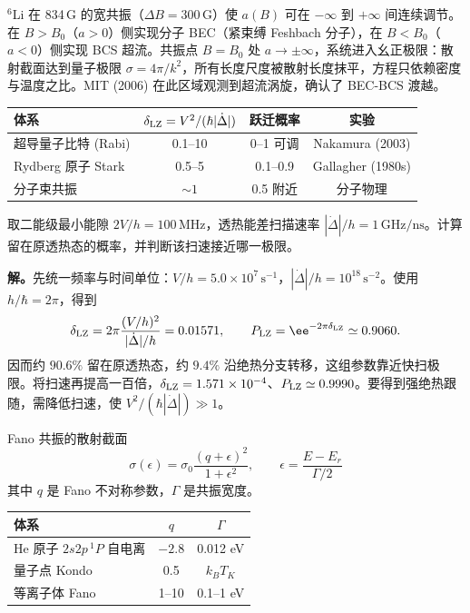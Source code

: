 \begin{exbox}
\(^6\)Li 在 834\,G 的宽共振（\(\Delta B=300\,\mathrm{G}\)）使 \(a(B)\) 可在 \(-\infty\) 到 \(+\infty\) 间连续调节。在 \(B>B_0\)（\(a>0\)）侧实现分子 BEC（紧束缚 Feshbach 分子），在 \(B<B_0\)（\(a<0\)）侧实现 BCS 超流。共振点 \(B=B_0\) 处 \(a\to\pm\infty\)，系统进入幺正极限：散射截面达到量子极限 \(\sigma=4\pi/k^2\)，所有长度尺度被散射长度抹平，方程只依赖密度与温度之比。MIT (2006) 在此区域观测到超流涡旋，确认了 BEC-BCS 渡越。
\end{exbox}

\begin{center}
\begin{tabular}{lccc}
\hline
体系 & \(\delta_{\rm LZ}=V^2/(\hbar|\dot\Delta|)\) & 跃迁概率 & 实验 \\
\hline
超导量子比特 (Rabi) & 0.1--10 & 0--1 可调 & Nakamura (2003) \\
Rydberg 原子 Stark & 0.5--5 & 0.1--0.9 & Gallagher (1980s) \\
分子束共振 & \(\sim1\) & 0.5 附近 & 分子物理 \\
\hline
\end{tabular}
\end{center}

\begin{exbox}[给定量子比特能隙与扫速的跃迁概率]
取二能级最小能隙 $2V/h=100\,\mathrm{MHz}$，透热能差扫描速率 $|\dot\Delta|/h=1\,\mathrm{GHz/ns}$。计算留在原透热态的概率，并判断该扫速接近哪一极限。

\textbf{解。}先统一频率与时间单位：$V/h=5.0\times10^7\,\mathrm{s^{-1}}$，$|\dot\Delta|/h=10^{18}\,\mathrm{s^{-2}}$。使用 $h/\hbar=2\pi$，得到
\[
 \delta_{\rm LZ}=2\pi\frac{(V/h)^2}{|\dot\Delta|/h}
 =0.01571,\qquad P_{\rm LZ}=\ee^{-2\pi\delta_{\rm LZ}}\simeq0.9060.
\]
因而约 $90.6\%$ 留在原透热态，约 $9.4\%$ 沿绝热分支转移，这组参数靠近快扫极限。将扫速再提高一百倍，$\delta_{\rm LZ}=1.571\times10^{-4}$、$P_{\rm LZ}\simeq0.9990$。要得到强绝热跟随，需降低扫速，使 $V^2/(\hbar|\dot\Delta|)\gg1$。
\end{exbox}

Fano 共振的散射截面
\[
\sigma(\epsilon)=\sigma_0\frac{(q+\epsilon)^2}{1+\epsilon^2},\qquad\epsilon=\frac{E-E_r}{\Gamma/2}
\]
其中 \(q\) 是 Fano 不对称参数，\(\Gamma\) 是共振宽度。

\begin{center}
\begin{tabular}{lcc}
\hline
体系 & \(q\) & \(\Gamma\) \\
\hline
He 原子 \(2s2p\,{}^1P\) 自电离 & \(-2.8\) & 0.012 eV \\
量子点 Kondo & 0.5 & \(k_BT_K\) \\
等离子体 Fano & 1--10 & 0.1--1 eV \\
\hline
\end{tabular}
\end{center}

